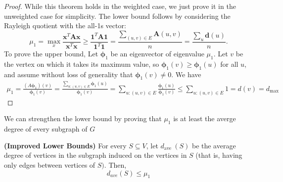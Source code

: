 \documentclass{article}
\newcommand{\bfs}[1]{\textbf{({#1}) }}
\begin{document}
\begin{proof}
While this theorem holds in the weighted case, we just prove it in the unweighted case for simplicity.
The lower bound follows by considering the Rayleigh quotient with the all-1s vector:
$$
\mu_{1}=\max _{x} \frac{\boldsymbol{x}^{T} \boldsymbol{A} \boldsymbol{x}}{\boldsymbol{x}^{T} \boldsymbol{x}} \geq \frac{\mathbf{1}^{T} \boldsymbol{A} \mathbf{1}}{\mathbf{1}^{T} \mathbf{1}}=\frac{\sum_{(u, v) \in E} \boldsymbol{A}(u, v)}{n}=\frac{\sum_{u} \boldsymbol{d}(u)}{n} .
$$
To prove the upper bound, Let $\boldsymbol{\phi}_{1}$ be an eigenvector of eigenvalue $\mu_{1}$. Let $v$ be the vertex on which it takes its maximum value, so $\boldsymbol{\phi}_{1}(v) \geq \boldsymbol{\phi}_{1}(u)$ for all $u$, and assume without loss of generality that $\boldsymbol{\phi}_{1}(v) \neq 0 .$ We have
\begin{align}
   \mu_{1}=\frac{\left(A \boldsymbol{\phi}_{1}\right)(v)}{\boldsymbol{\phi}_{1}(v)}=\frac{\sum_{u:(u, v) \in E} \boldsymbol{\phi}_{1}(u)}{\boldsymbol{\phi}_{1}(v)}=\sum_{u:(u, v) \in E} \frac{\boldsymbol{\phi}_{1}(u)}{\boldsymbol{\phi}_{1}(v)} \le \sum_{u:(u, v) \in E} 1 = d(v) = d_{\max } \label{aj:eq1}
\end{align}

\end{proof}
We can strengthen the lower bound by proving that $\mu_{1}$ is at least the averge degree of every subgraph of $G$

\begin{lema}{\bfs{Improved Lower Bounds}}\label{aj:lema2}
  For every $S \subseteq V$, let $d_{\text {ave }}(S)$ be the average degree of vertices in the subgraph induced on the vertices in $S$ (that is, having only edges between vertices of $S) .$ Then,
$$
d_{a v e}(S) \leq \mu_{1}
$$
\end{lema} 
\end{document}
